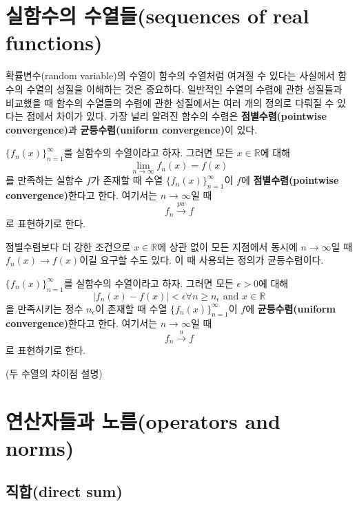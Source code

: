 \documentclass[b5paper,]{book}
\theoremstyle{definition}
\theoremstyle{definition}
\theoremstyle{definition}
\theoremstyle{remark}
\let\BeginKnitrBlock\begin \let\EndKnitrBlock\end
\begin{document}
\section{실함수의 수열들(sequences of real
functions)}\label{-sequences-of-real-functions}

확률변수(random variable)의 수열이 함수의 수열처럼 여겨질 수 있다는
사실에서 함수의 수열의 성질을 이해하는 것은 중요하다. 일반적인 수열의
수렴에 관한 성질들과 비교했을 때 함수의 수열들의 수렴에 관한 성질에서는
여러 개의 정의로 다뤄질 수 있다는 점에서 차이가 있다. 가장 널리 알려진
함수의 수렴은 \textbf{점별수렴(pointwise convergence)}과
\textbf{균등수렴(uniform convergence)}이 있다.

\BeginKnitrBlock{definition}[점별수렴]
\protect\hypertarget{def:unnamed-chunk-2}{}{\label{def:unnamed-chunk-2}
{} }\(\{ f_{n}(x)\}_{n=1}^{\infty}\)를 실함수의
수열이라고 하자. 그러면 모든 \(x\in\mathbb{R}\)에 대해
\[\lim_{n\rightarrow \infty}f_{n}(x)=f(x)\] 를 만족하는 실함수 \(f\)가
존재할 때 수열 \(\{ f_{n}(x)\}_{n=1}^{\infty}\)이 \(f\)에
\textbf{점별수렴(pointwise convergence)}한다고 한다. 여기서는
\(n\rightarrow \infty\)일 때 \[f_{n} \stackrel{pw}{\rightarrow} f\] 로
표현하기로 한다.
\EndKnitrBlock{definition}

점별수렴보다 더 강한 조건으로 \(x \in \mathbb{R}\)에 상관 없이 모든
지점에서 동시에 \(n\rightarrow\infty\)일 때
\(f_{n}(x) \rightarrow f(x)\)이길 요구할 수도 있다. 이 때 사용되는
정의가 균등수렴이다.

\BeginKnitrBlock{definition}[균등수렴]
\protect\hypertarget{def:unnamed-chunk-3}{}{\label{def:unnamed-chunk-3}
{} }\(\{ f_{n}(x)\}_{n=1}^{\infty}\)를 실함수의
수열이라고 하자. 그러면 모든 \(\epsilon > 0\)에 대해
\[|f_{n}(x)-f(x)| <\epsilon \forall n \geq n_{\epsilon} \text{ and } x\in \mathbb{R}\]
을 만족시키는 정수 \(n_{\epsilon}\)이 존재할 때 수열
\(\{ f_{n}(x)\}_{n=1}^{\infty}\)이 \(f\)에 \textbf{균등수렴(uniform
convergence)}한다고 한다. 여기서는 \(n\rightarrow \infty\)일 때
\[f_{n} \stackrel{u}{\rightarrow} f\] 로 표현하기로 한다.
\EndKnitrBlock{definition}

(두 수열의 차이점 설명)

\section{연산자들과 노름(operators and
norms)}\label{-operators-and-norms}

\subsection{직합(direct sum)}\label{direct-sum}
\end{document}
